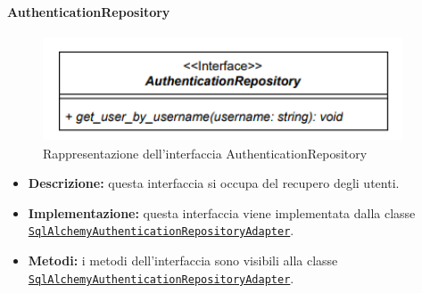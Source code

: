 \paragraph{AuthenticationRepository} \label{AuthenticationRepository}
\begin{figure}[H]
    \centering
    \includegraphics[width=0.95\textwidth]{assets/Backend/authentication_repository.png}
    \caption{Rappresentazione dell'interfaccia AuthenticationRepository}
  \end{figure}
\begin{itemize}
    \item \textbf{Descrizione:} questa interfaccia si occupa del recupero degli utenti.
    \item \textbf{Implementazione:} questa interfaccia viene implementata dalla classe \hyperref[SqlAlchemyAuthenticationRepositoryAdapter]{\texttt{SqlAlchemyAuthenticationRepositoryAdapter}}.
    \item \textbf{Metodi:} i metodi dell'interfaccia sono visibili alla classe \hyperref[SqlAlchemyAuthenticationRepositoryAdapter]{\texttt{SqlAlchemyAuthenticationRepositoryAdapter}}.
\end{itemize} 

